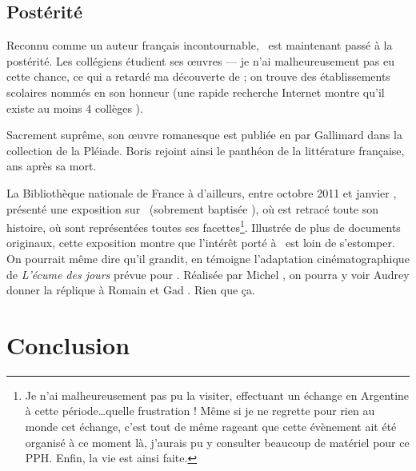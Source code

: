 \subsection{Postérité}
Reconnu comme un auteur français incontournable, \BV\ est maintenant passé à la postérité.
Les collégiens étudient ses \oe{}uvres --- je n'ai malheureusement pas eu cette chance,
ce qui a retardé ma découverte de \BV; on trouve des établissements scolaires nommés en
son honneur (une rapide recherche Internet montre qu'il existe au moins 4 collèges \BV).

Sacrement suprême, son \oe{}uvre romanesque est publiée en  par Gallimard dans la collection
de la Pléiade. Boris rejoint ainsi le panthéon de la littérature française,  ans après sa mort.

La Bibliothèque nationale de France à d'ailleurs, entre octobre 2011 et janvier , présenté
une exposition sur \BV\ (sobrement baptisée \emph{\BV}), où est retracé toute son histoire, où sont
représentées toutes ses facettes\footnote{Je n'ai malheureusement pas pu la visiter, effectuant
un échange en Argentine à cette période\ldots quelle frustration ! Même si je ne regrette pour
rien au monde cet échange, c'est tout de même rageant que cette évènement ait été organisé à ce
moment là, j'aurais pu y consulter beaucoup de matériel pour ce PPH. Enfin, la vie est ainsi faite.}.
Illustrée de plus de  documents originaux, cette
exposition montre que l'intérêt porté à \BV\ est loin de s'estomper. On pourrait même dire qu'il
grandit, en témoigne l'adaptation cinématographique de \emph{L'écume des jours} prévue pour .
Réalisée par Michel , on pourra y voir Audrey  donner la réplique à
Romain  et Gad . Rien que ça.




\section*{Conclusion}

